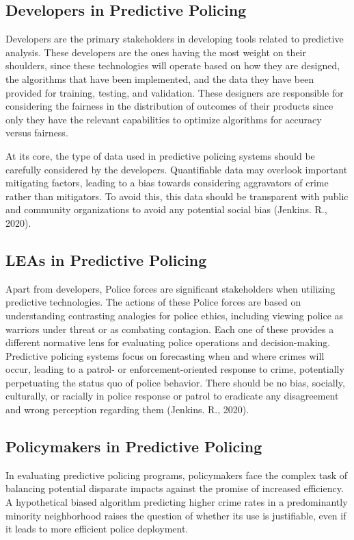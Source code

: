 \documentclass[man, noextraspace]{apa7} %
\begin{document}
\subsection{Developers in Predictive Policing}
Developers are the primary stakeholders in developing tools related to predictive 
analysis. These developers are the ones having the most weight on their shoulders, since these 
technologies will operate based on how they are designed, the algorithms that have been 
implemented, and the data they have been provided for training, testing, and validation. These 
designers are responsible for considering the fairness in the distribution of outcomes of their products since only they have the relevant capabilities to optimize algorithms for accuracy versus 
fairness. 

At its core, the type of data used in predictive policing systems should be carefully 
considered by the developers. Quantifiable data may overlook important mitigating factors, 
leading to a bias towards considering aggravators of crime rather than mitigators. To avoid this, 
this data should be transparent with public and community organizations to avoid any potential 
social bias (Jenkins. R., 2020). 

\subsection{LEAs in Predictive Policing}
Apart from developers, Police forces are significant stakeholders when utilizing 
predictive technologies. The actions of these Police forces are based on understanding 
contrasting analogies for police ethics, including viewing police as warriors under threat or as 
combating contagion. Each one of these provides a different normative lens for evaluating 
police operations and decision-making. Predictive policing systems focus on forecasting when 
and where crimes will occur, leading to a patrol- or enforcement-oriented response to crime, 
potentially perpetuating the status quo of police behavior. There should be no bias, socially, 
culturally, or racially in police response or patrol to eradicate any disagreement and wrong 
perception regarding them (Jenkins. R., 2020).

\subsection{Policymakers in Predictive Policing}
In evaluating predictive policing programs, policymakers face the complex task of 
balancing potential disparate impacts against the promise of increased efficiency. A hypothetical 
biased algorithm predicting higher crime rates in a predominantly minority neighborhood raises 
the question of whether its use is justifiable, even if it leads to more efficient police deployment. 
\end{document}
